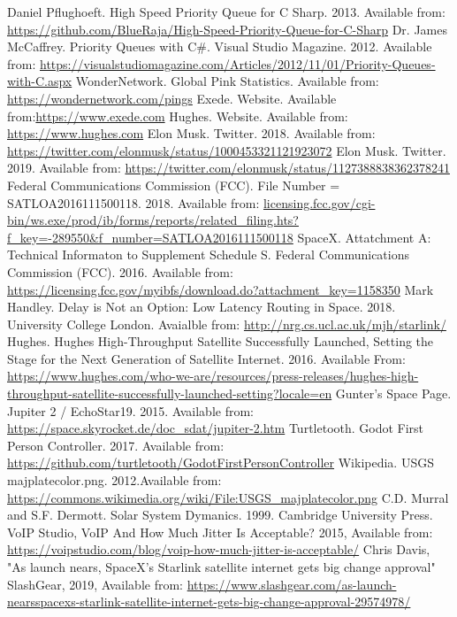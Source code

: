 \documentclass[12pt]{report}
\begin{document}
\begin{thebibliography}{99}
	 Daniel Pflughoeft. High Speed Priority Queue for C Sharp.
	2013. Available from:  \url{https://github.com/BlueRaja/High-Speed-Priority-Queue-for-C-Sharp}
	 Dr. James McCaffrey. Priority Queues with C\#. 
	Visual Studio Magazine. 2012. Available from: \url{https://visualstudiomagazine.com/Articles/2012/11/01/Priority-Queues-with-C.aspx}
	 WonderNetwork. Global Pink Statistics. 
	Available from: \url{https://wondernetwork.com/pings}
	 Exede. Website.
	Available from:\url{https://www.exede.com}
	 Hughes. Website.
	Available from: \url{https://www.hughes.com}
	 Elon Musk. Twitter.
	2018. Available from: \url{https://twitter.com/elonmusk/status/1000453321121923072}
	 Elon Musk. Twitter.
	2019. Available from: \url{https://twitter.com/elonmusk/status/1127388838362378241}
	 Federal Communications Commission (FCC). File Number = SATLOA2016111500118.
	2018. Available from: \url{licensing.fcc.gov/cgi-bin/ws.exe/prod/ib/forms/reports/related_filing.hts?f_key=-289550&f_number=SATLOA2016111500118}
	 SpaceX. Attatchment A: Technical Informaton to Supplement Schedule S.
	Federal Communications Commission (FCC). 2016. Available from: \url{https://licensing.fcc.gov/myibfs/download.do?attachment_key=1158350}
	 Mark Handley. Delay is Not an Option: Low Latency Routing in Space.
	2018. University College London. Avaialble from: \url{http://nrg.cs.ucl.ac.uk/mjh/starlink/}
	 Hughes. Hughes High-Throughput Satellite Successfully Launched, Setting the Stage for the Next Generation of Satellite Internet.
	2016. Available From: \url{https://www.hughes.com/who-we-are/resources/press-releases/hughes-high-throughput-satellite-successfully-launched-setting?locale=en}
	 Gunter's Space Page. Jupiter 2 / EchoStar19.
	2015. Available from: \url{https://space.skyrocket.de/doc_sdat/jupiter-2.htm}
	 Turtletooth. Godot First Person Controller. 
	2017. Available from: \url{https://github.com/turtletooth/GodotFirstPersonController}
	 Wikipedia. USGS majplatecolor.png.
	2012.Available from: \url{https://commons.wikimedia.org/wiki/File:USGS_majplatecolor.png}
	 C.D. Murral and S.F. Dermott. Solar System Dymanics. 1999. Cambridge University Press.
	 VoIP Studio, VoIP And How Much Jitter Is Acceptable?
	2015, Available from: \url{https://voipstudio.com/blog/voip-how-much-jitter-is-acceptable/}
	 Chris Davis, "As launch nears, SpaceX’s Starlink satellite internet gets big change approval"
	SlashGear, 2019, Available from: \url{https://www.slashgear.com/as-launch-nearsspacexs-starlink-satellite-internet-gets-big-change-approval-29574978/}
\end{thebibliography}
\appendix

\end{document}
